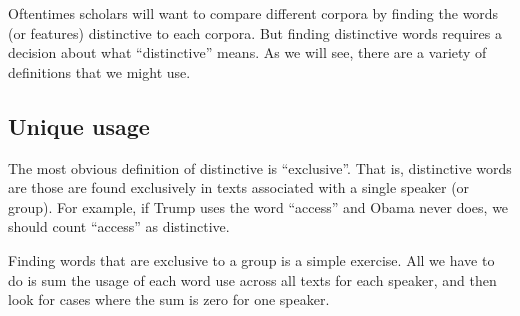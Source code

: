 \documentclass[]{book}
\begin{document}
Oftentimes scholars will want to compare different corpora by finding the words (or features) distinctive to each corpora. But finding distinctive words requires a decision about what ``distinctive'' means. As we will see, there are a variety of definitions that we might use.

\hypertarget{unique-usage}{%
\subsection{Unique usage}\label{unique-usage}}

The most obvious definition of distinctive is ``exclusive''. That is, distinctive words are those are found exclusively in texts associated with a single speaker (or group). For example, if Trump uses the word ``access'' and Obama never does, we should count ``access'' as distinctive.

Finding words that are exclusive to a group is a simple exercise. All we have to do is sum the usage of each word use across all texts for each speaker, and then look for cases where the sum is zero for one speaker.
\end{document}
